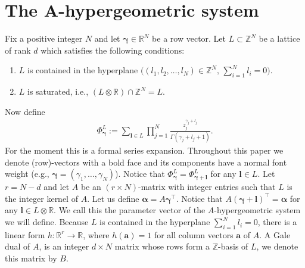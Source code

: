 \section[The A-hypergeometric system]{The ${\boldsymbol A}$-hypergeometric system}\label{chap-ahyp}

Fix a positive integer $N$ and let $\bm{\gamma}\in\mathbb{R}^N$ be a row vector. Let $L\subset\mathbb{Z}^N$ be a lattice of
rank $d$ which satisfies the following conditions:
\begin{enumerate}\itemsep=0pt
\item $L$ is contained in the hyperplane $\big((l_1,l_2,\dots,l_N) \in \mathbb{Z}^N, \, \sum_{i=1}^Nl_i=0\big)$.
\item $L$ is saturated, i.e., $(L\otimes\mathbb{R})\cap\mathbb{Z}^N=L$.
\end{enumerate}
Now define
\begin{gather*}
\Phi_{\bm{\gamma}}^L:=\sum_{\bm{l}\in L}\prod_{j=1}^N\frac{z_j^{\gamma_j+l_j}}
{\Gamma(\gamma_j+l_j+1)}.
\end{gather*}
For the moment this is a formal series expansion. Throughout this paper we denote (row)-vectors with a bold face and its components have a normal font weight (e.g., $\bm{\gamma} = (\gamma_1,\dots,\gamma_N )$).
Notice that $\Phi_{\bm{\gamma}}^L
=\Phi_{\bm{\gamma}+\bm{l}}^L$ for any $\bm{l}\in L$.
Let $r = N-d$ and let $A$ be an $(r \times N)$-matrix with integer entries such that $L$ is
the integer kernel of $A$.
Let us define
$\bm{\alpha}=A\bm{\gamma}^\intercal$. Notice that $A(\bm{\gamma}+\bm{l})^\intercal
=\bm{\alpha}$ for any $\bm{l}\in L\otimes\mathbb{R}$.
We call this the parameter vector of the $A$-hypergeometric system we will define.
Because $L$ is contained in the hyperplane $\sum_{i=1}^Nl_i=0$, there is a linear form $h\colon \mathbb{R}^{r} \rightarrow \mathbb{R}$, where $h(\bm{a}) = 1$ for all column vectors $\bm{a}$ of $A$. A Gale dual of $A$, is an integer $d\times N$ matrix whose rows form a
$\mathbb{Z}$-basis of $L$, we denote this matrix by $B$.

